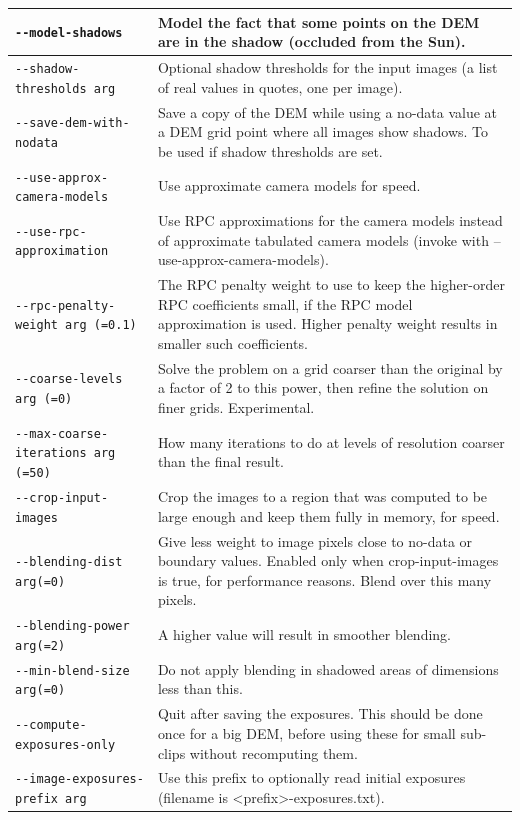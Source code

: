 \begin{longtable}{|l|p{7.5cm}|}
\texttt{-\/-model-shadows} & Model the fact that some points on the DEM are in the shadow (occluded from the Sun).\\ \hline
\texttt{-\/-shadow-thresholds arg} & Optional shadow thresholds for the input images (a list of real values in quotes, one per image).\\ \hline
\texttt{-\/-save-dem-with-nodata} & Save a copy of the DEM while using a no-data value at a DEM grid point where all images show shadows. To be used if shadow thresholds are set.\\ \hline
\texttt{-\/-use-approx-camera-models} & Use approximate camera models for speed.\\ \hline
\texttt{-\/-use-rpc-approximation} & Use RPC approximations for the camera models instead of approximate tabulated camera models (invoke with --use-approx-camera-models).\\ \hline
\texttt{-\/-rpc-penalty-weight arg (=0.1)} & The RPC penalty weight to use to keep the higher-order RPC coefficients small, if the RPC model approximation is used. Higher penalty weight results in smaller such coefficients.\\ \hline
\texttt{-\/-coarse-levels arg (=0)} & Solve the problem on a grid coarser than the original by a factor of 2 to this power, then refine the solution on finer grids. Experimental.\\ \hline
\texttt{-\/-max-coarse-iterations arg (=50)} & How many iterations to do at levels of resolution coarser than the final result.\\ \hline
\texttt{-\/-crop-input-images} & Crop the images to a region that was computed to be large enough and keep them fully in memory, for speed.\\ \hline
\texttt{-\/-blending-dist arg(=0)} & Give less weight to image pixels close to no-data or boundary values. Enabled only when crop-input-images is true, for performance reasons. Blend over this many pixels. \\ \hline
\texttt{-\/-blending-power arg(=2)} & A higher value will result in smoother blending. \\ \hline
\texttt{-\/-min-blend-size arg(=0)} & Do not apply blending in shadowed areas of dimensions less than this. \\ \hline
\texttt{-\/-compute-exposures-only} & Quit after saving the exposures. This should be done once for a big DEM, before using these for small sub-clips without recomputing them.\\ \hline
\texttt{-\/-image-exposures-prefix arg} & Use this prefix to optionally read initial exposures (filename is <prefix>-exposures.txt).\\ \hline

\end{longtable}
